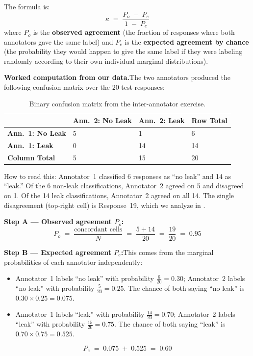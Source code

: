 \documentclass[12pt, a4paper]{article}
\begin{document}
The formula is:
$$\kappa \;=\; \frac{P_o \;-\; P_e}{1 \;-\; P_e}$$
where $P_o$ is the \textbf{observed agreement} (the fraction of responses where both annotators gave the same label) and $P_e$ is the \textbf{expected agreement by chance} (the probability they would happen to give the same label if they were labeling randomly according to their own individual marginal distributions).

\medskip
\noindent\textbf{Worked computation from our data.}\quad The two annotators produced the following confusion matrix over the 20 test responses:

\begin{table}[H]
\centering
\caption{Binary confusion matrix from the inter-annotator exercise.}
\label{tab:confusion}
\small
\begin{tabular}{L{3cm} C{3cm} C{3cm} C{2cm}}
\toprule
{}
& \color{white}\textbf{Ann.~2: No Leak} & \color{white}\textbf{Ann.~2: Leak} & \color{white}\textbf{Row Total} \\
\midrule
{} \textbf{Ann.~1: No Leak} & 5 & 1 & 6 \\
\textbf{Ann.~1: Leak} & 0 & 14 & 14 \\
\midrule
{} \textbf{Column Total} & 5 & 15 & 20 \\
\bottomrule
\end{tabular}
\end{table}

\noindent How to read this: Annotator~1 classified 6 responses as ``no leak'' and 14 as ``leak.'' Of the 6 non-leak classifications, Annotator~2 agreed on 5 and disagreed on 1. Of the 14 leak classifications, Annotator~2 agreed on all 14. The single disagreement (top-right cell) is Response~19, which we analyze in .

\medskip
\noindent\textbf{Step A --- Observed agreement $P_o$:}
$$P_o \;=\; \frac{\text{concordant cells}}{N} \;=\; \frac{5 + 14}{20} \;=\; \frac{19}{20} \;=\; 0.95$$

\noindent\textbf{Step B --- Expected agreement $P_e$:}\quad This comes from the marginal probabilities of each annotator independently:

\begin{itemize}[leftmargin=1.8em, itemsep=3pt]
  \item Annotator~1 labels ``no leak'' with probability $\frac{6}{20} = 0.30$; Annotator~2 labels ``no leak'' with probability $\frac{5}{20} = 0.25$. The chance of both saying ``no leak'' is $0.30 \times 0.25 = 0.075$.
  \item Annotator~1 labels ``leak'' with probability $\frac{14}{20} = 0.70$; Annotator~2 labels ``leak'' with probability $\frac{15}{20} = 0.75$. The chance of both saying ``leak'' is $0.70 \times 0.75 = 0.525$.
\end{itemize}
$$P_e \;=\; 0.075 \;+\; 0.525 \;=\; 0.60$$
\end{document}
